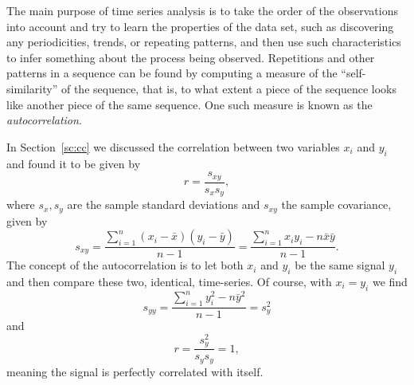 	The main purpose of time series analysis is to take the order of the observations into account 
and try to learn the properties of the data set, such as discovering any periodicities, trends, or repeating patterns, and 
then use such characteristics to infer something about the process being observed.  Repetitions and 
other patterns in a sequence can be found by computing a measure of the ``self-similarity'' of the 
sequence, that is, to what extent a piece of the sequence looks like another piece of the same sequence.  One such 
measure is known as the \emph{autocorrelation}.
     
In Section~\ref{sc:cc} we discussed the correlation between two variables $x_i$ and $y_i$ and found it 
to be given by 
\begin{equation}
r = \displaystyle \frac{s_{xy}}{s_x s_y},
\end{equation}
where $s_x, s_y$ are the sample standard deviations and $s_{xy}$ the sample covariance, given by
\begin{equation}
s_{xy} = \frac{\displaystyle \sum^n_{i=1} (x_i - \bar{x})(y_i - \bar{y})}{n-1} = \frac{\displaystyle  \sum^n_{i=1} x_i y_i - n \bar{x} \bar{y}}{n-1}.
\end{equation}
The concept of the autocorrelation is to let both $x_i$ and $y_i$ be the same signal $y_i$ and then compare 
these two, identical, time-series.  Of course, with 
$x_i = y_i$ we find
\begin{equation}
s_{yy} = \frac{\displaystyle \sum^n_{i=1} y^2_i -  n\bar{y}^2}{n-1} = s^2 _y
\end{equation}
and
\begin{equation}
r =\frac{ \displaystyle  s^2_y}{s_y s_y} = 1,
\end{equation}
meaning the signal is perfectly correlated with itself.


